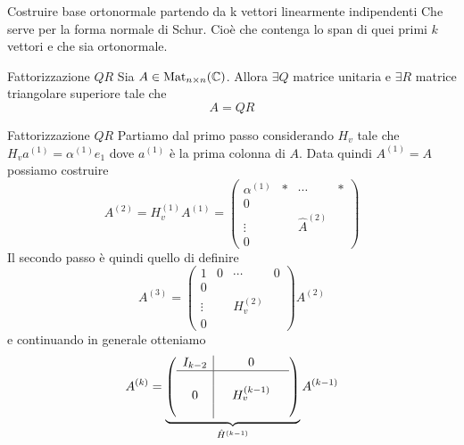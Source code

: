 \documentclass[a4paper]{article}
\begin{document}
\begin{snippetexercise}{}
    Costruire base ortonormale partendo da k vettori linearmente indipendenti
    Che serve per la forma normale di Schur.
    Cioè che contenga lo span di quei primi \(k\) vettori
    e che sia ortonormale.
\end{snippetexercise}

\begin{snippettheorem}{Fattorizzazione \(QR\)}
    Sia \(A \in \operatorname{Mat}_{n \times n}(\mathbb{C})\).
    Allora \(\exists Q\) matrice unitaria e
    \(\exists R\) matrice triangolare superiore tale che
    \[
        A = QR
    \]
\end{snippettheorem}

\begin{snippetproof}{Fattorizzazione \(QR\)}
    Partiamo dal primo passo considerando
    \(H_v\) tale che \(H_v a^{(1)} = \alpha^{(1)}e_1\)
    dove \(a^{(1)}\) è la prima colonna di \(A\).
    Data quindi \(A^{(1)} = A\) possiamo costruire
    \[
        A^{(2)} = H_v^{(1)} A^{(1)} = \left(
            \begin{array}{c|ccc}
                \alpha^{(1)} & \ast & \cdots & \ast \\
                \hline
                0 & & & \\
                \vdots & & \hat{A}^{(2)} & \\
                0 & & &
            \end{array}
        \right)
    \]
    Il secondo passo è quindi quello di definire \[
        A^{(3)} = \left(
            \begin{array}{c|ccc}
                1 & 0 & \cdots & 0 \\
                \hline
                0 & & & \\
                \vdots & & H_v^{(2)} & \\
                0 & & &
            \end{array}
        \right) A^{(2)}
    \]
    e continuando in generale otteniamo \[
        A^{(k)} = \underbrace{\left(
                \begin{array}{c|ccc}
                    I_{k-2} & & 0 & \\
                    \hline
                    & & & \\
                    0 & & H_v^{(k-1)} & \\
                    & & &
                \end{array}
        \right)}_{\hat H^{(k-1)}} A^{(k-1)}
\]
\end{snippetproof}
\end{document}
